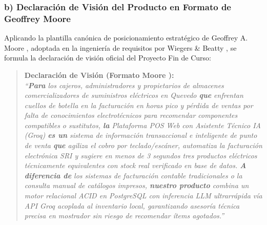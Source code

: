 \subsubsection{b) Declaración de Visión del Producto en Formato de Geoffrey Moore}
Aplicando la plantilla canónica de posicionamiento estratégico de Geoffrey A. Moore \cite{moore2014}, adoptada en la ingeniería de requisitos por Wiegers \& Beatty \cite{wiegers2013}, se formula la declaración de visión oficial del Proyecto Fin de Curso:

\begin{quote}
\textbf{Declaración de Visión (Formato Moore \cite{moore2014}):} \\
\textit{``\textbf{Para} los cajeros, administradores y propietarios de almacenes comercializadores de suministros eléctricos en Quevedo \textbf{que} enfrentan cuellos de botella en la facturación en horas pico y pérdida de ventas por falta de conocimientos electrotécnicos para recomendar componentes compatibles o sustitutos, \textbf{la} Plataforma POS Web con Asistente Técnico IA (Groq) \textbf{es un} sistema de información transaccional e inteligente de punto de venta \textbf{que} agiliza el cobro por teclado/escáner, automatiza la facturación electrónica SRI y sugiere en menos de 3 segundos tres productos eléctricos técnicamente equivalentes con stock real verificado en base de datos. \textbf{A diferencia de} los sistemas de facturación contable tradicionales o la consulta manual de catálogos impresos, \textbf{nuestro producto} combina un motor relacional ACID en PostgreSQL con inferencia LLM ultrarrápida vía API Groq acoplada al inventario local, garantizando asesoría técnica precisa en mostrador sin riesgo de recomendar ítems agotados.''}
\end{quote}
